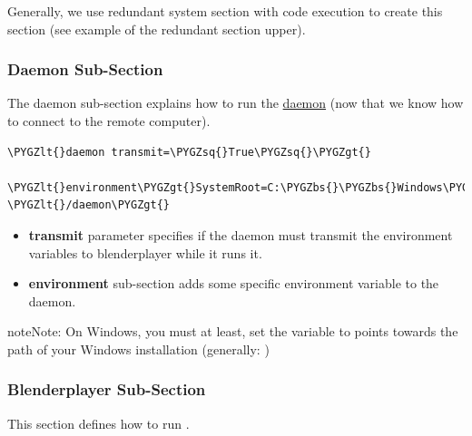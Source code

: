 \documentclass[a4,10pt,openany,oneside]{sphinxmanual}
\def\PYGZbs{\char`\\}
\def\PYGZlt{\char`\<}
\def\PYGZgt{\char`\>}
\def\PYGZsq{\char`\'}
\begin{document}
Generally, we use redundant system section with code execution to create this section (see example of the redundant section upper).


\subsubsection{Daemon Sub-Section}
\label{components/configuration-file:daemon-sub-section}
The daemon sub-section explains how to run the {\hyperref[components/configuration-file:daemon]{daemon}} (now that we know how to connect to the remote computer).

\begin{Verbatim}[commandchars=\\\{\}]
\PYGZlt{}daemon transmit=\PYGZsq{}True\PYGZsq{}\PYGZgt{}
  \PYGZlt{}environment\PYGZgt{}SystemRoot=C:\PYGZbs{}\PYGZbs{}Windows\PYGZlt{}/environment\PYGZgt{}
\PYGZlt{}/daemon\PYGZgt{}
\end{Verbatim}
\begin{itemize}
\item {} 
\textbf{transmit} parameter specifies if the daemon must transmit the environment variables to blenderplayer while it runs it.

\item {} 
\textbf{environment} sub-section adds some specific environment variable to the daemon.

\end{itemize}

\begin{notice}{note}{Note:}
On Windows, you must at least, set the  variable to points towards the path of your Windows installation (generally: )
\end{notice}


\subsubsection{Blenderplayer Sub-Section}
\label{components/configuration-file:blenderplayer-sub-section}
This section defines how to run .
\end{document}

